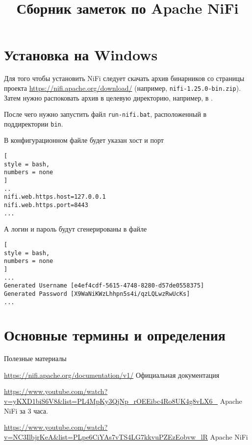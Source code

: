 \documentclass[%
	11pt,
	a4paper,
	utf8,
		]{article}
\begin{document}
\title{Сборник заметок по Apache NiFi}

\author{}

\date{}
\maketitle

\thispagestyle{fancy}

\tableofcontents

\section{Установка на Windows}

Для того чтобы установить NiFi следует скачать архив бинарников со страницы проекта \url{https://nifi.apache.org/download/} (например, \verb*|nifi-1.25.0-bin.zip|). Затем нужно распоковать архив в целевую директорию, например, в . 

После чего нужно запустить файл \verb*|run-nifi.bat|, расположенный в поддиректории \verb*|bin|.

В конфигурационном файле  будет указан хост и порт
\begin{lstlisting}[
style = bash,
numbers = none
]
..
nifi.web.https.host=127.0.0.1
nifi.web.https.port=8443
...
\end{lstlisting}

А логин и пароль будут сгенерированы в файле 
\begin{lstlisting}[
style = bash,
numbers = none
]
...
Generated Username [e4ef4cdf-5615-4748-8280-d57de0558375]
Generated Password [X9WaNiKWzLhhpn5s4i/qzLQLwzRwUcKs]
...
\end{lstlisting}

\section{Основные термины и определения}

Полезные материалы

\noindent\url{https://nifi.apache.org/documentation/v1/} Официальная документация

\noindent\url{https://www.youtube.com/watch?v=yKXD1biS6V8&list=PL4MpKy3QjNp_rOEEibc4Ro8UK4g8vLX6_} Apache NiFi за 3 часа.

\noindent\url{https://www.youtube.com/watch?v=NC3IlbjrKeA&list=PLpe6CiYAs7vTS4LG7kkvuPZEzEobvw_lR} Apache NiFi
\end{document}
